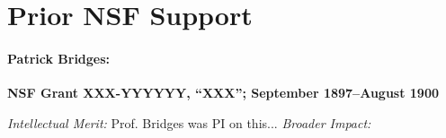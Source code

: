 \section{Prior NSF Support}
\label{sec:prior}

\paragraph{Patrick Bridges:}
\textbf{NSF Grant XXX-YYYYYY, ``XXX''; September 1897--August 1900}
\noindent

\noindent\textit{Intellectual Merit:}
Prof. Bridges was PI on this...
\noindent\textit{Broader Impact:}
